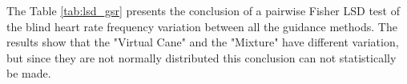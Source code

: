 

The Table \ref{tab:lsd_gsr} presents the conclusion of a pairwise Fisher LSD test of the blind heart rate frequency variation between all the guidance methods. The results show that the "Virtual Cane" and the "Mixture" have different variation, but since they are not normally distributed this conclusion can not statistically be made.



%
%
%
%
%
%
%
%
%
%
%    
%
%

